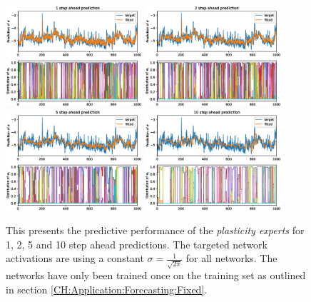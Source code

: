 \begin{figure}
    \begin{center}
        \includegraphics[width=0.45\textwidth]{Plots/Prediction/Plasticity_Constant_1step.eps}
        \includegraphics[width=0.45\textwidth]{Plots/Prediction/Plasticity_Constant_2step.eps} \\
        \includegraphics[width=0.45\textwidth]{Plots/Prediction/Plasticity_Constant_5step.eps}
        \includegraphics[width=0.45\textwidth]{Plots/Prediction/Plasticity_Constant_10step.eps}
    \end{center}
    \caption{This presents the predictive performance of the \textit{plasticity experts} for 1, 2, 5 and 10 step ahead predictions. The targeted network activations are using a constant $\sigma = \frac{1}{\sqrt{2\pi}}$ for all networks. The networks have only been trained once on the training set as outlined in section \ref{CH:Application:Forecasting:Fixed}.}
    \label{FIG:PlasticityConstant}
\end{figure}

